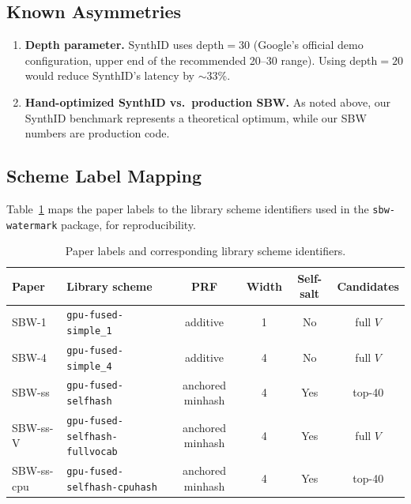 \documentclass[11pt]{article}
\begin{document}
\subsection{Known Asymmetries}

\begin{enumerate}
\item \textbf{Depth parameter.} SynthID uses depth$=30$ (Google's official demo configuration, upper end of the recommended 20--30 range). Using depth$=20$ would reduce SynthID's latency by $\sim$33\%.

\item \textbf{Hand-optimized SynthID vs.\ production SBW.} As noted above, our SynthID benchmark represents a theoretical optimum, while our SBW numbers are production code. %
\end{enumerate}


\subsection{Scheme Label Mapping}

Table~\ref{tab:scheme_mapping} maps the paper labels to the library scheme identifiers used in the \texttt{sbw-watermark} package, for reproducibility.

\begin{table}[h]
\caption{Paper labels and corresponding library scheme identifiers.}
\label{tab:scheme_mapping}
\begin{center}
\footnotesize
\begin{tabular}{@{}llcccc@{}}
\toprule
Paper & Library scheme & PRF & Width & Self-salt & Candidates \\
\midrule
SBW-1 & \texttt{gpu-fused-simple\_1} & additive & 1 & No & full $V$ \\
SBW-4 & \texttt{gpu-fused-simple\_4} & additive & 4 & No & full $V$ \\
SBW-ss & \texttt{gpu-fused-selfhash} & anchored minhash & 4 & Yes & top-40 \\
SBW-ss-V & \texttt{gpu-fused-selfhash-fullvocab} & anchored minhash & 4 & Yes & full $V$ \\
SBW-ss-cpu & \texttt{gpu-fused-selfhash-cpuhash} & anchored minhash & 4 & Yes & top-40 \\
\bottomrule
\end{tabular}
\end{center}
\end{table}
\end{document}
